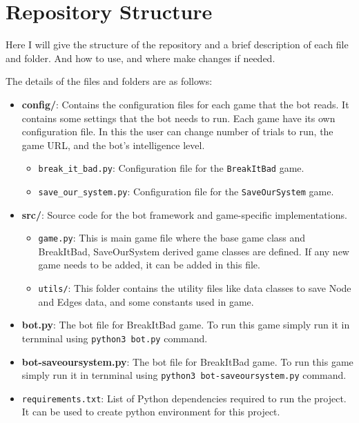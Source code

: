 \documentclass[12pt,a4paper]{article}
\begin{document}
    \section{Repository Structure}
    Here I will give the structure of the repository and a brief description of each file and folder. And how to use, and where make changes if needed.


    \vspace{1cm}
    The details of the files and folders are as follows:

    \begin{itemize}
        \item \textbf{config/}: Contains the configuration files for each game that the bot reads. It contains some settings that the bot needs to run. Each game have its own configuration file. In this the user can change number of trials to run, the game URL, and the bot's intelligence level.
            \begin{itemize}
                \item \texttt{break\_it\_bad.py}: Configuration file for the \texttt{BreakItBad} game.
                \item \texttt{save\_our\_system.py}: Configuration file for the \texttt{SaveOurSystem} game.
            \end{itemize}
        \item \textbf{src/}: Source code for the bot framework and game-specific implementations.
            \begin{itemize}
                \item \texttt{game.py}: This is main game file where the base game class and BreakItBad, SaveOurSystem derived game classes are defined. If any new game needs to be added, it can be added in this file.
                \item \texttt{utils/}: This folder contains the utility files like data classes to save Node and Edges data, and some constants used in game.
            \end{itemize}
        \item \textbf{bot.py}: The bot file for BreakItBad game. To run this game simply run it in ternminal using \texttt{python3 bot.py} command.
        \item \textbf{bot-saveoursystem.py}: The bot file for BreakItBad game. To run this game simply run it in ternminal using \texttt{python3 bot-saveoursystem.py} command.
        \item \texttt{requirements.txt}: List of Python dependencies required to run the project. It can be used to create python environment for this project.
    \end{itemize}
\end{document}
